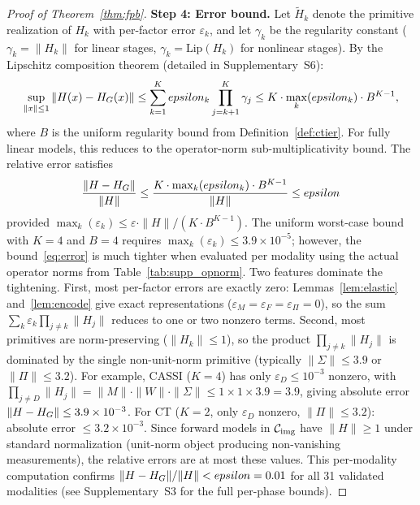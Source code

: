 \documentclass[11pt]{article}
\begin{document}
\begin{proof}[Proof of Theorem~\ref{thm:fpb}]
\textbf{Step 4: Error bound.} Let $\tilde{H}_k$ denote the primitive realization of $H_k$ with per-factor error $\varepsilon_k$, and let $\gamma_k$ be the regularity constant ($\gamma_k = \|H_k\|$ for linear stages, $\gamma_k = \mathrm{Lip}(H_k)$ for nonlinear stages). By the Lipschitz composition theorem (detailed in Supplementary~S6):
\begin{equation}
  \sup_{\|x\| \leq 1} \|H(x) - H_{G}(x)\| \leq \sum_{k=1}^{K} epsilon_k \prod_{j=k+1}^{K} \gamma_j \leq K \cdot \max_k(epsilon_k) \cdot B^{K-1},
  \label{eq:error}
\end{equation}
where $B$ is the uniform regularity bound from Definition~\ref{def:ctier}. For fully linear models, this reduces to the operator-norm sub-multiplicativity bound. The relative error satisfies
\[
  \frac{\|H - H_{G}\|}{\|H\|} \leq \frac{K \cdot \max_k(epsilon_k) \cdot B^{K-1}}{\|H\|} \leq epsilon
\]
provided $\max_k(\varepsilon_k) \leq \varepsilon \cdot \|H\| / (K \cdot B^{K-1})$. The uniform worst-case bound with $K=4$ and $B=4$ requires $\max_k(\varepsilon_k) \leq 3.9 \times 10^{-5}$; however, the bound~\eqref{eq:error} is much tighter when evaluated per modality using the actual operator norms from Table~\ref{tab:supp_opnorm}. Two features dominate the tightening. First, most per-factor errors are exactly zero: Lemmas~\ref{lem:elastic} and~\ref{lem:encode} give exact representations ($\varepsilon_M = \varepsilon_F = \varepsilon_\Pi = 0$), so the sum $\sum_k \varepsilon_k \prod_{j \neq k}\|H_j\|$ reduces to one or two nonzero terms. Second, most primitives are norm-preserving ($\|H_k\| \leq 1$), so the product $\prod_{j \neq k}\|H_j\|$ is dominated by the single non-unit-norm primitive (typically $\|\Sigma\| \leq 3.9$ or $\|\Pi\| \leq 3.2$). For example, CASSI ($K=4$) has only $\varepsilon_D \leq 10^{-3}$ nonzero, with $\prod_{j \neq D}\|H_j\| = \|M\|\cdot\|W\|\cdot\|\Sigma\| \leq 1 \times 1 \times 3.9 = 3.9$, giving absolute error $\|H - H_{G}\| \leq 3.9 \times 10^{-3}$. For CT ($K=2$, only $\varepsilon_D$ nonzero, $\|\Pi\| \leq 3.2$): absolute error $\leq 3.2 \times 10^{-3}$. Since forward models in $\mathcal{C}_{\mathrm{img}}$ have $\|H\| \geq 1$ under standard normalization (unit-norm object producing non-vanishing measurements), the relative errors are at most these values. This per-modality computation confirms $\|H - H_{G}\|/\|H\| < epsilon = 0.01$ for all 31 validated modalities (see Supplementary~S3 for the full per-phase bounds).


\end{proof}
\end{document}
